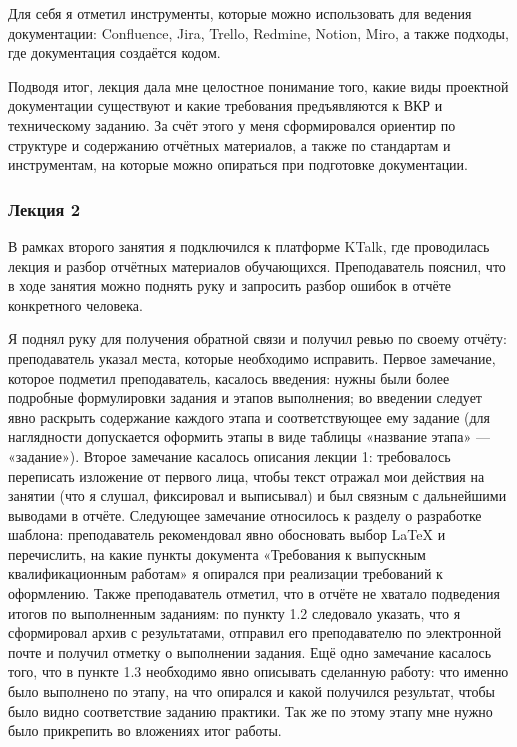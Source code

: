 Для себя я отметил инструменты, которые можно использовать для ведения документации: Confluence, Jira, Trello, Redmine, Notion, Miro, а также подходы, где документация создаётся кодом.

Подводя итог, лекция дала мне целостное понимание того, какие виды проектной документации существуют и какие требования предъявляются к ВКР и техническому заданию.
За счёт этого у меня сформировался ориентир по структуре и содержанию отчётных материалов, а также по стандартам и инструментам, на которые можно опираться при подготовке документации.

\subsubsection{Лекция 2}

В рамках второго занятия я подключился к платформе KTalk, где проводилась лекция и разбор отчётных материалов обучающихся.
Преподаватель пояснил, что в ходе занятия можно поднять руку и запросить разбор ошибок в отчёте конкретного человека.

Я поднял руку для получения обратной связи и получил ревью по своему отчёту: преподаватель указал места, которые необходимо исправить.
Первое замечание, которое подметил преподаватель, касалось введения: нужны были более подробные формулировки задания и этапов выполнения; во введении следует явно раскрыть содержание каждого этапа и соответствующее ему задание (для наглядности допускается оформить этапы в виде таблицы «название этапа» — «задание»).
Второе замечание касалось описания лекции 1: требовалось переписать изложение от первого лица, чтобы текст отражал мои действия на занятии (что я слушал, фиксировал и выписывал) и был связным с дальнейшими выводами в отчёте.
Следующее замечание относилось к разделу о разработке шаблона: преподаватель рекомендовал явно обосновать выбор LaTeX{} и перечислить, на какие пункты документа «Требования к выпускным квалификационным работам» я опирался при реализации требований к оформлению.
Также преподаватель отметил, что в отчёте не хватало подведения итогов по выполненным заданиям: по пункту 1.2 следовало указать, что я сформировал архив с результатами, отправил его преподавателю по электронной почте и получил отметку о выполнении задания.
Ещё одно замечание касалось того, что в пункте 1.3 необходимо явно описывать сделанную работу: 
что именно было выполнено по этапу, 
на что опирался и какой получился результат, чтобы было видно соответствие заданию практики. Так же по этому этапу мне нужно было прикрепить во вложениях итог работы.

